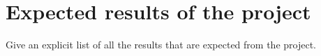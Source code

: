 \section{Expected results of the project} 
Give an explicit list of all the results that are expected from the project. 
